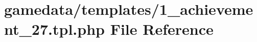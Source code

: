 \hypertarget{1__achievement__27_8tpl_8php}{\section{gamedata/templates/1\+\_\+achievement\+\_\+27.tpl.\+php File Reference}
\label{1__achievement__27_8tpl_8php}
}
